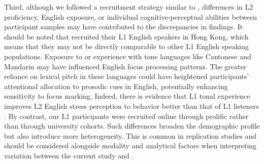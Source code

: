 Third, although we followed a recruitment strategy similar to \textcite{ge2021a}, differences in L2 proficiency, English exposure, or individual cognitive-perceptual abilities between participant samples may have contributed to the discrepancies in findings. It should be noted that \textcite{ge2021a} recruited their L1 English speakers in Hong Kong, which means that they may not be directly comparable to other L1 English speaking populations. Exposure to or experience with tone languages like Cantonese and Mandarin may have influenced English focus processing patterns. The greater reliance on lexical pitch in these languages could have heightened participants’ attentional allocation to prosodic cues in English, potentially enhancing sensitivity to focus marking. Indeed, there is evidence that L1 tonal experience improves L2 English stress perception to behavior better than that of L1 listeners \parencite{choi2019better, choi2021cantonese}. By contrast, our L1 participants were recruited online through prolific rather than through university cohorts. Such differences broaden the demographic profile but also 
introduce more heterogeneity. This is common in replication studies and should be considered alongside modality and analytical factors when interpreting variation between the current study and \textcite{ge2021a}.


